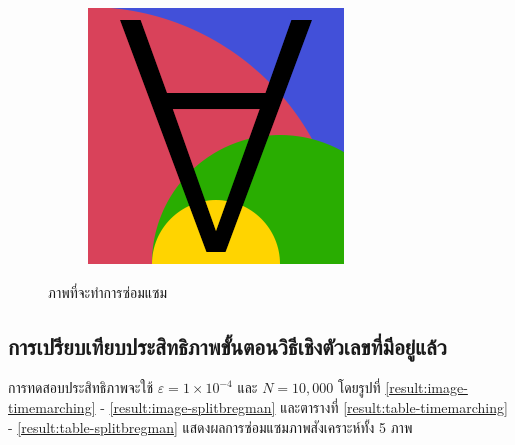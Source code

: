 \begin{figure}[H]
\begin{subfigure}{0.4\linewidth}
        \includegraphics[width=0.8\linewidth]{image/image_inpaint_synthetic/case05-toinpaint.png}		
    \end{subfigure}
    \caption{ภาพที่จะทำการซ่อมแซม}
\end{figure}
\subsection{การเปรียบเทียบประสิทธิภาพขั้นตอนวิธีเชิงตัวเลขที่มีอยู่แล้ว}
\hspace{1cm}
การทดสอบประสิทธิภาพจะใช้ $\varepsilon = 1 \times 10^{-4}$ และ $N= 10,000$ โดยรูปที่ \ref{result:image-timemarching} - \ref{result:image-splitbregman} และตารางที่ \ref{result:table-timemarching} - \ref{result:table-splitbregman} แสดงผลการซ่อมแซมภาพสังเคราะห์ทั้ง 5 ภาพ


